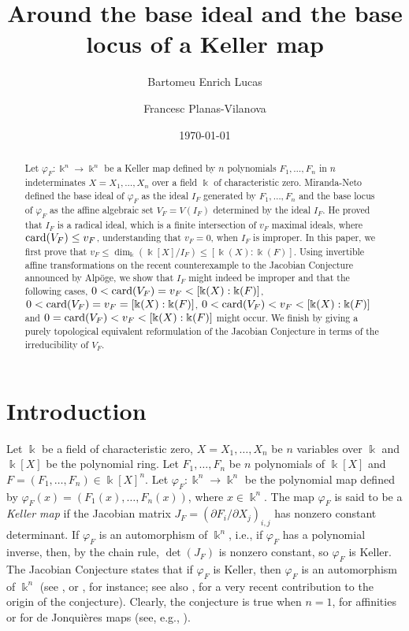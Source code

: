 \documentclass[11pt,reqno]{amsart}
\title[Base Ideal and base locus of a Keller map]{Around the base ideal and the base locus of a Keller map}
\author[B. Enrich Lucas]{Bartomeu Enrich Lucas}
\author[F. Planas-Vilanova]{Francesc Planas-Vilanova}
\date{\today}
\theoremstyle{definition}
\newcommand{\mbk}{\mbox{$\Bbbk$}}
\newcommand{\card}{\mbox{${\rm card}$}}
\begin{document}
\begin{abstract}
Let $\varphi_F:\mbk^n\to\mbk^n$ be a Keller map defined by $n$ polynomials $F_1,\ldots,F_n$ in $n$ indeterminates $X=X_1,\ldots,X_n$ over a field $\mbk$ of characteristic zero. 
Miranda-Neto defined the base ideal of $\varphi_F$ as the ideal $I_F$ generated by $F_1,\ldots,F_n$ and the base locus of $\varphi_F$ as the affine algebraic set $V_F=V(I_F)$ determined by the ideal $I_F$. He proved that $I_F$ is a radical ideal, which is a finite intersection of $v_F$ maximal ideals, where
$\card(V_F)\leq v_F$, understanding that $v_F=0$, when $I_F$ is improper. 
In this paper, we first prove that $v_F\leq \dim_{\Bbbk}(\mbk[X]/I_F)\leq [\mbk(X):\mbk(F)]$.
Using invertible affine transformations on the recent counterexample to the Jacobian Conjecture announced by Alp\"oge, we show that $I_F$ might indeed be improper 
and that the following cases, $0<\card(V_F)=v_F<[\mbk(X):\mbk(F)]$, $0<\card(V_F)=v_F=[\mbk(X):\mbk(F)]$, $0<\card(V_F)<v_F<[\mbk(X):\mbk(F)]$ and $0=\card(V_F)<v_F<[\mbk(X):\mbk(F)]$
might occur. We finish by giving a purely topological equivalent reformulation of the Jacobian Conjecture in terms of the irreducibility of $V_F$.  
\end{abstract}

\maketitle 

\section{Introduction}

Let $\mbk$ be a field of characteristic zero, $X=X_1,\ldots,X_n$ be $n$ variables over $\mbk$ and $\mbk[X]$ be the polynomial ring. Let $F_1,\ldots,F_n$ be $n$ polynomials of $\mbk[X]$ and $F=(F_1,\ldots,F_n)\in\mbk[X]^n$. Let $\varphi_F:\mbk^n\to\mbk^n$ be the polynomial map defined by $\varphi_F(x)=(F_1(x),\ldots,F_n(x))$, where $x\in\mbk^n$. The map 
$\varphi_F$ is said to be a \emph{Keller map} if the Jacobian matrix $J_F=(\partial F_i/\partial X_j)_{i,j}$ has nonzero constant determinant.
If $\varphi_F$ is an automorphism of $\mbk^n$, i.e., if $\varphi_F$ has a polynomial inverse, then, by the chain rule, $\det(J_F)$ is nonzero constant, so $\varphi_F$ is Keller. The Jacobian Conjecture states that if $\varphi_F$ is Keller, then $\varphi_F$ is an automorphism of $\mbk^n$ (see
\cite{keller}, \cite{bcw} or \cite{vde1}, for instance; 
see also \cite{rd}, for a very recent contribution to the origin of the conjecture). 
Clearly, the conjecture is true when $n=1$, for affinities or for de Jonqui\`eres maps (see, e.g., \cite{vde1}). 
\end{document}
